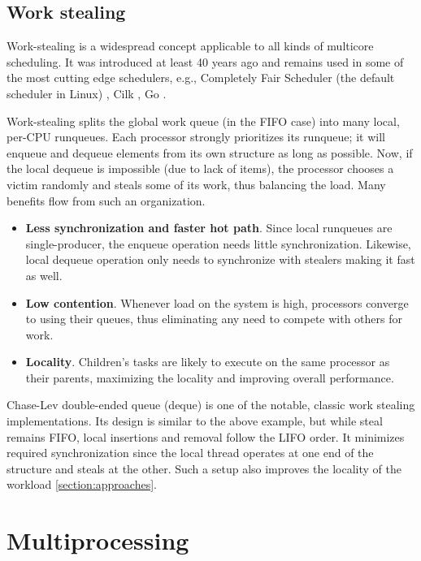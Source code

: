 \documentclass[12pt,a4paper,twoside]{report}
\begin{document}
\subsection{Work stealing}
\label{section:background-work-stealing}
Work-stealing is a widespread concept applicable to all kinds of multicore scheduling. It was introduced at least 40 years ago \cite{Blumofe1999} and remains used in some of the most cutting edge schedulers, e.g., Completely Fair Scheduler (the default scheduler in Linux) \cite{linux_cfs}, Cilk \cite{Blumofe1995}, Go \cite{golang}.

Work-stealing splits the global work queue (in the FIFO case) into many local, per-CPU runqueues. Each processor strongly prioritizes its runqueue; it will enqueue and dequeue elements from its own structure as long as possible. Now, if the local dequeue is impossible (due to lack of items), the processor chooses a victim randomly and steals some of its work, thus balancing the load. Many benefits flow from such an organization. 
\begin{itemize}
    \item \textbf{Less synchronization and faster hot path}. Since local runqueues are single-producer, the enqueue operation needs little synchronization. Likewise, local dequeue operation only needs to synchronize with stealers making it fast as well. 
    \item \textbf{Low contention}. Whenever load on the system is high, processors converge to using their queues, thus eliminating any need to compete with others for work.
    \item \textbf{Locality}. Children's tasks are likely to execute on the same processor as their parents, maximizing the locality and improving overall performance.
\end{itemize}

\label{paragraph:deque}
Chase-Lev double-ended queue (deque) is one of the notable, classic work stealing implementations. Its design is similar to the above example, but while steal remains FIFO, local insertions and removal follow the LIFO order. It minimizes required synchronization since the local thread operates at one end of the structure and steals at the other. Such a setup also improves the locality of the workload \ref{section:approaches}. 

\section{Multiprocessing}
\label{section:background_multiprocessing}
\end{document}
